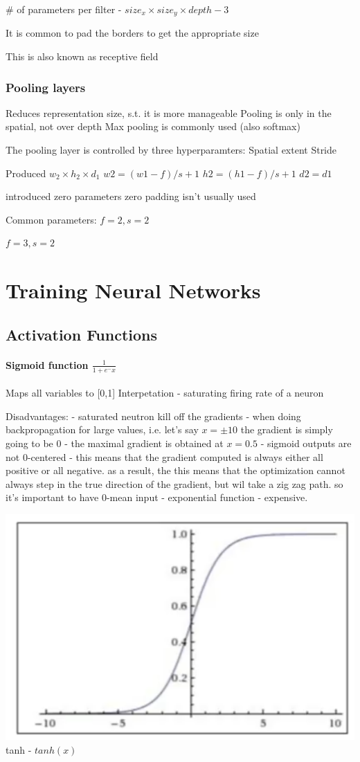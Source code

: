 \# of parameters per filter - $size_x \times size_y \times depth - 3$

It is common to pad the borders to get the appropriate size

This is also known as receptive field

\subsubsection{Pooling layers}

Reduces representation size, s.t. it is more manageable 
Pooling is only in the spatial, not over depth
Max pooling is commonly used (also softmax)

The pooling layer is controlled by three hyperparamters:
Spatial extent 
Stride 

Produced $w_2 \times h_2 \times d_1$
$w2 = (w1 - f)/s + 1$
$h2 = (h1 - f)/s + 1$
$d2 = d1$

introduced zero parameters
zero padding isn't usually used

Common parameters:
$f=2, s=2 $

$f=3, s=2$

\section{Training Neural Networks}

\subsection{Activation Functions}

\paragraph{Sigmoid function $\frac{1}{1+e^-x}$}
Maps all variables to [0,1]
Interpetation - saturating firing rate of a neuron 

Disadvantages:
- saturated neutron kill off the gradients - when doing backpropagation for large values, i.e. let's say $x = \pm10 $ the gradient is simply going to be 0 
- the maximal gradient is obtained at $x = 0.5$ 
- sigmoid outputs are not 0-centered - this means that the gradient computed is always either all positive or all negative. as a result, the this means that the optimization cannot always step in the true direction of the gradient, but wil take a zig zag path. so it's important to have 0-mean input
- exponential function - expensive.

\includegraphics[width=0.5\columnwidth]{fei_fei_li/lecture_06/sigmoid.png}
tanh - $tanh(x)$ 

